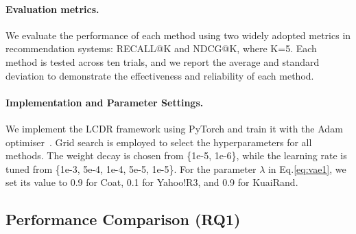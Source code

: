 \documentclass[sigconf]{acmart}
\begin{document}
\paragraph{Evaluation metrics.} We evaluate the performance of each method using two widely adopted metrics in recommendation systems:  RECALL@K and NDCG@K, where K=5. Each method is tested across ten trials, and we report the average and standard deviation  to demonstrate the effectiveness and reliability of each method.






\paragraph{Implementation and Parameter Settings.}
We implement the LCDR framework using PyTorch and train it with the Adam optimiser~\cite{kingma2014adam}.
Grid search is employed to select the hyperparameters for all methods. The weight decay is chosen from  \{1e-5, 1e-6\}, while the learning rate is tuned from \{1e-3, 5e-4, 1e-4, 5e-5, 1e-5\}.
For the parameter $\lambda$ in Eq.\eqref{eq:vae1}, we set its value to 0.9 for Coat, 0.1 for Yahoo!R3, and 0.9 for KuaiRand.



\subsection{Performance Comparison (\textbf{RQ1})}



\end{document}

